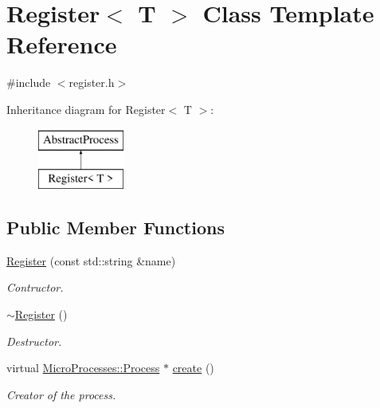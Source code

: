 \hypertarget{classRegister}{}\section{Register$<$ T $>$ Class Template Reference}
\label{classRegister}


{\ttfamily \#include $<$register.\+h$>$}

Inheritance diagram for Register$<$ T $>$\+:\begin{figure}[H]
\begin{center}
\leavevmode
\includegraphics[height=2.000000cm]{classRegister}
\end{center}
\end{figure}
\subsection*{Public Member Functions}
\begin{DoxyCompactItemize}
\item 
\mbox{\label{classRegister_a009b50170f81ae1cf3996fc713b13ab6}} 
\mbox{\hyperlink{classRegister_a009b50170f81ae1cf3996fc713b13ab6}{Register}} (const std\+::string \&name)
\begin{DoxyCompactList}\small\item\em Contructor. \end{DoxyCompactList}\item 
\mbox{\label{classRegister_a6ea38ad87b77e21ce8eaeb1aefd29cad}} 
\mbox{\hyperlink{classRegister_a6ea38ad87b77e21ce8eaeb1aefd29cad}{$\sim$\+Register}} ()
\begin{DoxyCompactList}\small\item\em Destructor. \end{DoxyCompactList}\item 
\mbox{\label{classRegister_abe8bb728066c0cdad90a6f631dc7a1d0}} 
virtual \mbox{\hyperlink{classMicroProcesses_1_1Process}{Micro\+Processes\+::\+Process}} $\ast$ \mbox{\hyperlink{classRegister_abe8bb728066c0cdad90a6f631dc7a1d0}{create}} ()
\begin{DoxyCompactList}\small\item\em Creator of the process. \end{DoxyCompactList}\end{DoxyCompactItemize}


